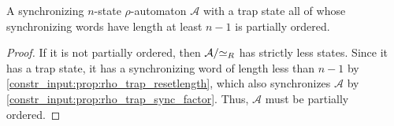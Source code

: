 \begin{corollary} \label{constr_input:prop:rho_extremal_sync_then_pto}
	A synchronizing $n$-state $\rho$-automaton $\mathcal A$ with a trap state all of whose
	synchronizing words have length at least $n - 1$
	is partially ordered.
\end{corollary} 
\begin{proof}
	If it is not partially ordered, then $\mathcal A / {\simeq_R}$
	has strictly less states. Since it has a trap state,
	it has a synchronizing word
	of length less than $n - 1$ by \cref{constr_input:prop:rho_trap_resetlength},
	which also synchronizes $\mathcal A$
	by \cref{constr_input:prop:rho_trap_sync_factor}.
	Thus, $\mathcal A$ must be partially ordered.	
\end{proof}